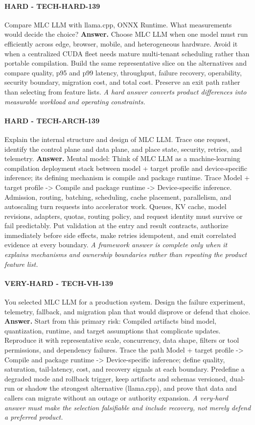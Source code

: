 \paragraph{HARD - TECH-HARD-139} Compare MLC LLM with llama.cpp, ONNX Runtime. What measurements would decide the choice?
\textbf{Answer.} Choose MLC LLM when one model must run efficiently across edge, browser, mobile, and heterogeneous hardware. Avoid it when a centralized CUDA fleet needs mature multi-tenant scheduling rather than portable compilation. Build the same representative slice on the alternatives and compare quality, p95 and p99 latency, throughput, failure recovery, operability, security boundary, migration cost, and total cost. Preserve an exit path rather than selecting from feature lists.
\textit{A hard answer converts product differences into measurable workload and operating constraints.}
\paragraph{HARD - TECH-ARCH-139} Explain the internal structure and design of MLC LLM. Trace one request, identify the control plane and data plane, and place state, security, retries, and telemetry.
\textbf{Answer.} Mental model: Think of MLC LLM as a machine-learning compilation deployment stack between model + target profile and device-specific inference; its defining mechanism is compile and package runtime. Trace Model + target profile -> Compile and package runtime -> Device-specific inference. Admission, routing, batching, scheduling, cache placement, parallelism, and autoscaling turn requests into accelerator work. Queues, KV cache, model revisions, adapters, quotas, routing policy, and request identity must survive or fail predictably. Put validation at the entry and result contracts, authorize immediately before side effects, make retries idempotent, and emit correlated evidence at every boundary.
\textit{A framework answer is complete only when it explains mechanisms and ownership boundaries rather than repeating the product feature list.}
\paragraph{VERY-HARD - TECH-VH-139} You selected MLC LLM for a production system. Design the failure experiment, telemetry, fallback, and migration plan that would disprove or defend that choice.
\textbf{Answer.} Start from this primary risk: Compiled artifacts bind model, quantization, runtime, and target assumptions that complicate updates. Reproduce it with representative scale, concurrency, data shape, filters or tool permissions, and dependency failures. Trace the path Model + target profile -> Compile and package runtime -> Device-specific inference; define quality, saturation, tail-latency, cost, and recovery signals at each boundary. Predefine a degraded mode and rollback trigger, keep artifacts and schemas versioned, dual-run or shadow the strongest alternative (llama.cpp), and prove that data and callers can migrate without an outage or authority expansion.
\textit{A very-hard answer must make the selection falsifiable and include recovery, not merely defend a preferred product.}
